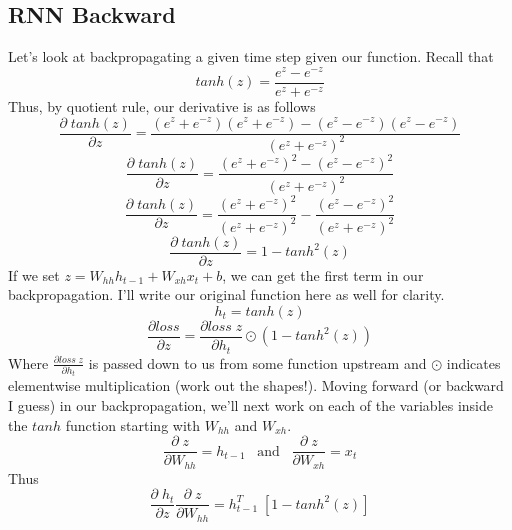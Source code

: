 \documentclass[12pt]{article}
\begin{document}
\subsection{RNN Backward}
Let's look at backpropagating a given time step given our function. Recall that 
\begin{equation*}
    tanh(z) = \frac{e^z - e^{-z}}{e^z + e^{-z}}
\end{equation*}
Thus, by quotient rule, our derivative is as follows
\begin{equation*}
    \frac{\partial \; tanh(z)}{\partial z} = 
    \frac{(e^z + e^{-z})(e^z + e^{-z}) 
    - (e^z - e^{-z})(e^z - e^{-z})}
    {(e^z + e^{-z})^2}
\end{equation*} \begin{equation*}
    \frac{\partial \; tanh(z)}{\partial z} = 
    \frac{(e^z + e^{-z})^2 - (e^z - e^{-z})^2}
    {(e^z + e^{-z})^2}
\end{equation*} \begin{equation*}
    \frac{\partial \; tanh(z)}{\partial z} = 
    \frac{(e^z + e^{-z})^2}
    {(e^z + e^{-z})^2} -
    \frac{(e^z - e^{-z})^2}
    {(e^z + e^{-z})^2}
\end{equation*}\begin{equation*}
    \frac{\partial \; tanh(z)}{\partial z} = 
    1 - tanh^2(z)
\end{equation*} 
If we set $z = W_{hh}h_{t-1} + W_{xh}x_t + b$, we can get the first term in our backpropagation.
I'll write our original function here as well for clarity. 
\begin{equation}
    h_t = tanh(z)
\end{equation}
\begin{equation*}
    \frac{\partial loss}{\partial z} = 
    \frac{\partial loss\; z}{\partial h_t} \odot
    (1 - tanh^2(z))
\end{equation*} 
Where $\frac{\partial loss\; z}{\partial h_t}$ is passed down to us from some function upstream 
and $\odot$ indicates elementwise multiplication (work out the shapes!). 
Moving forward (or backward I guess) in our backpropagation, we'll next work 
on each of the variables inside the $tanh$ function starting with $W_{hh}$ and 
$W_{xh}$. 
\begin{equation*}
    \frac{\partial \; z}{\partial W_{hh}} = h_{t-1} \; \; \; \text{and} \; \; \;
    \frac{\partial \; z}{\partial W_{xh}} = x_t
\end{equation*}
Thus 
\begin{equation*}
    \frac{\partial \; h_t}{\partial z} \frac{\partial \; z}{\partial W_{hh}} = 
    h_{t-1}^T \; [1 - tanh^2(z)] 
\end{equation*}
\end{document}
